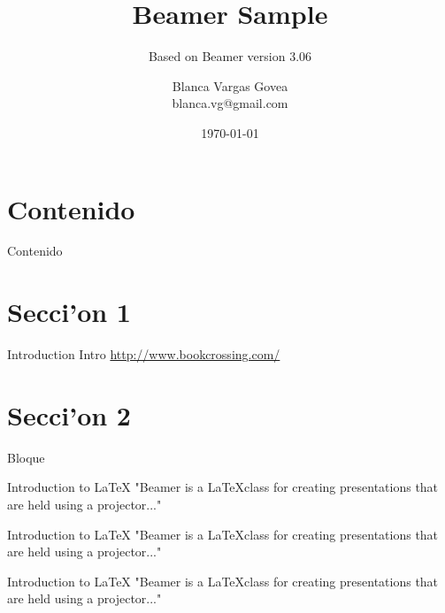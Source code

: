 \documentclass[xcolor=svgnames]{beamer}
\begin{document}
\title{Beamer Sample}
\subtitle{Based on Beamer version 3.06}
\author{Blanca Vargas Govea \\ blanca.vg@gmail.com}
\date{\today}

\begin{frame}[plain] 
  \titlepage
\end{frame}
\section*{Contenido}
\begin{frame}{Contenido}
  \tableofcontents%
\end{frame}
\section{Secci'on 1}
\begin{frame}{Introduction}
Intro
\url{http://www.bookcrossing.com/}
\end{frame}

\section{Secci'on 2}

\begin{frame}{Bloque}
\begin{block}{Introduction to {\LaTeX}}
"Beamer is a {\LaTeX}class for creating presentations
that are held using a projector..."
\end{block}

\begin{example}{Introduction to {\LaTeX}}
"Beamer is a {\LaTeX}class for creating presentations
that are held using a projector..."
\end{example}

\begin{alertblock}{Introduction to {\LaTeX}}
"Beamer is a {\LaTeX}class for creating presentations
that are held using a projector..."
\end{alertblock}

\end{frame}
%
%
\end{document}
